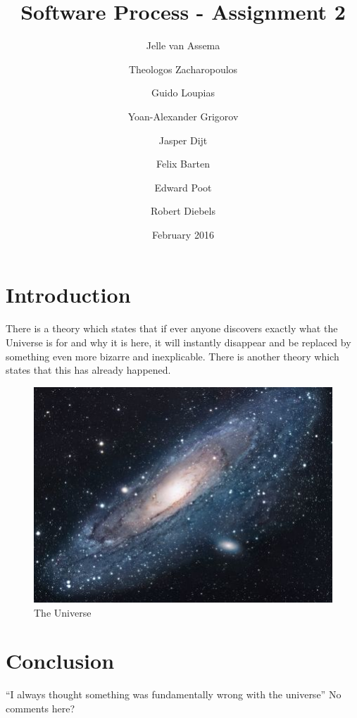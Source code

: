 \documentclass{article}
\title{Software Process - Assignment 2}
\author{
    Jelle van Assema\\
    \and
    Theologos Zacharopoulos\\
    \and
    Guido Loupias\\
    \and 
    Yoan-Alexander Grigorov\\
    \and 
    Jasper Dijt\\
    \and 
    Felix Barten\\
    \and 
    Edward Poot\\ 
    \and 
    Robert Diebels
}
\date{February 2016}
\begin{document}
\maketitle

\section{Introduction}
There is a theory which states that if ever anyone discovers exactly what the Universe is for and why it is here, it will instantly disappear and be replaced by something even more bizarre and inexplicable.
There is another theory which states that this has already happened.

\begin{figure}[h!]
\centering
\includegraphics[scale=1.7]{universe.jpg}
\caption{The Universe}
\label{fig:univerise}
\end{figure}

\section{Conclusion}
``I always thought something was fundamentally wrong with the universe'' \citep[All pages]{adams1995hitchhiker}
No comments here?



\end{document}
